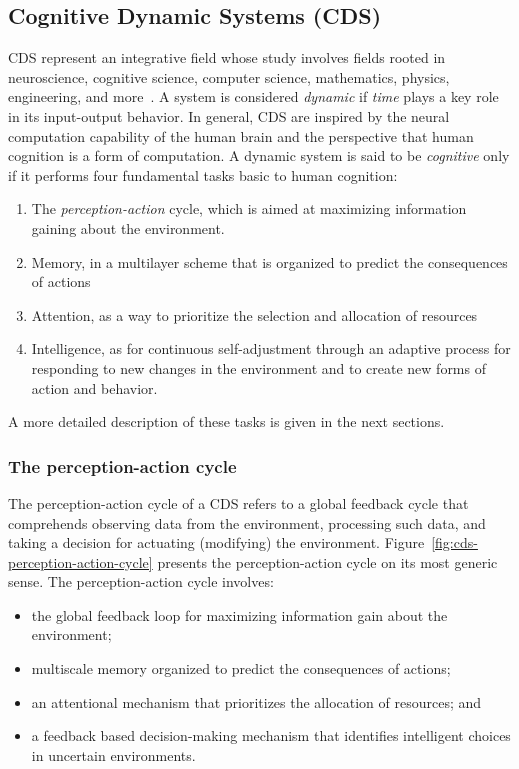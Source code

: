 \documentclass[ENG,PhD]{cinvestav}
\begin{document}
\subsection{Cognitive Dynamic Systems (CDS)}
CDS represent an integrative field whose study involves fields rooted in neuroscience, cognitive science, computer science, mathematics, physics, engineering, and more~\cite{Haykin2006,Haykin2012}.
A system is considered \emph{dynamic} if \emph{time} plays a key role in its input-output behavior.
In general, CDS are inspired by the neural computation capability of the human brain and the perspective that human cognition is a form of computation.
A dynamic system is said to be \emph{cognitive} only if it performs four fundamental tasks basic to human cognition:
\begin{enumerate}
  \item The \emph{perception-action} cycle, which is aimed at maximizing information gaining about the environment.
  \item Memory, in a multilayer scheme that is organized to predict the consequences of actions
  \item Attention, as a way to prioritize the selection and allocation of resources
  \item Intelligence, as for continuous self-adjustment through an adaptive process for responding to new changes in the environment and to create new forms of action and behavior.
\end{enumerate}

A more detailed description of these tasks is given in the next sections.

\subsubsection*{The perception-action cycle}
The perception-action cycle of a CDS refers to a global feedback cycle that comprehends observing data from the environment, processing such data, and taking a decision for actuating (modifying) the environment.
Figure~\ref{fig:cds-perception-action-cycle} presents the perception-action cycle on its most generic sense.
The perception-action cycle involves:
\begin{itemize}
  \item the global feedback loop for maximizing information gain about the environment;
  \item multiscale memory organized to predict the consequences of actions;
  \item an attentional mechanism that prioritizes the allocation of resources; and
  \item a feedback based decision-making mechanism that identifies intelligent choices in uncertain environments.
\end{itemize}
\end{document}
